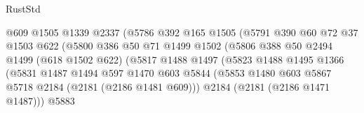 \begin{lexlean}{RustStd}
\begin{coremodule}
                                    @609
                                    @1505
                                    @1339
                                    @2337
                                    (@5786
                                      @392
                                      @165
                                      @1505
                                      (@5791
                                        @390
                                        @60
                                        @72
                                        @37
                                        @1503
                                        @622
                                        (@5800
                                          @386
                                          @50
                                          @71
                                          @1499
                                          @1502
                                          (@5806
                                            @388
                                            @50
                                            @2494
                                            @1499
                                            (@618 @1502 @622)
                                            (@5817
                                              @1488
                                              @1497
                                              (@5823
                                                @1488
                                                @1495
                                                @1366
                                                (@5831
                                                  @1487
                                                  @1494
                                                  @597
                                                  @1470
                                                  @603
                                                  @5844
                                                  (@5853
                                                    @1480
                                                    @603
                                                    @5867
                                                    @5718
                                                    @2184
                                                    (@2181 (@2186 @1481 @609)))
                                                  @2184
                                                  (@2181 (@2186 @1471 @1487)))
                                                @5883

\end{coremodule}
\end{lexlean}
